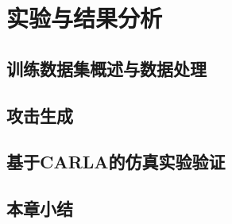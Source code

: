 \section{实验与结果分析}
\subsection{训练数据集概述与数据处理}
\subsection{攻击生成}
\subsection{基于CARLA的仿真实验验证}
\subsection{本章小结}
